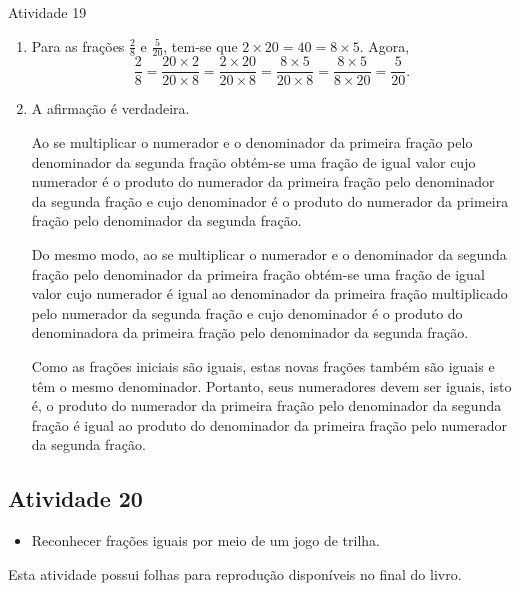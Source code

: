 \begin{multicols}{2}
\begin{resposta*}{Atividade 19}  
\begin{enumerate} [\quad a)] %
    \item       Para as frações       $\frac{2}{8}$       e       
$\frac{5}{20}$, tem-se que        $2 \times 20 = 40 = 8 \times 5$. Agora,       
$$\frac{2}{8} = \frac{20 \times 2}{20 \times 8} = \frac{2 \times 20}{20 \times 
8} = \frac{8 \times 5}{20 \times 8} = \frac{8 \times 5}{8 \times 20} = 
\frac{5}{20}.$$
    \item       A afirmação é verdadeira. 
  
  Ao se multiplicar o numerador e o denominador da primeira fração pelo 
denominador da segunda fração obtém-se uma fração de igual valor cujo numerador 
é o produto do numerador da primeira fração pelo denominador da segunda fração e 
cujo denominador é o produto do numerador da primeira fração pelo denominador da 
segunda fração.   
  
  Do mesmo modo, ao se multiplicar o numerador e o denominador da segunda fração 
pelo denominador da primeira fração obtém-se uma fração de igual valor cujo 
numerador é igual ao denominador da primeira fração multiplicado pelo numerador 
da segunda fração e cujo denominador é o produto do denominadora da primeira 
fração pelo denominador da segunda fração.   
  
  Como as frações iniciais são iguais, estas novas frações também são iguais e 
têm o mesmo denominador. Portanto, seus numeradores devem ser iguais, isto é, o 
produto do numerador da primeira fração pelo denominador da segunda fração é 
igual ao produto do denominador da primeira fração pelo numerador da segunda 
fração.  
\end{enumerate} %

  \end{resposta*}


\subsection{Atividade 20}

\begin{itemize} %
    \item       Reconhecer frações iguais por meio de um jogo de trilha.
\end{itemize} %
  
  
  Esta atividade possui     folhas para reprodução disponíveis no final do 
livro.
  

\end{multicols}
